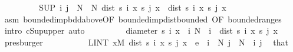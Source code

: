 \begin{isabellebody}
\ \ \ \ \ \ \isamarkupfalse%
\ \isamarkupfalse%
\ {\isachardoublequoteopen}{\isacharparenleft}{\kern0pt}SUP\ {\isacharparenleft}{\kern0pt}i{\isacharcomma}{\kern0pt}\ j{\isacharparenright}{\kern0pt}\ {\isasymin}\ {\isacharbraceleft}{\kern0pt}N{\isachardot}{\kern0pt}{\isachardot}{\kern0pt}{\isacharbraceright}{\kern0pt}\ {\isasymtimes}\ {\isacharbraceleft}{\kern0pt}N{\isachardot}{\kern0pt}{\isachardot}{\kern0pt}{\isacharbraceright}{\kern0pt}{\isachardot}{\kern0pt}\ dist\ {\isacharparenleft}{\kern0pt}s\ i\ x{\isacharparenright}{\kern0pt}\ {\isacharparenleft}{\kern0pt}s\ j\ x{\isacharparenright}{\kern0pt}{\isacharparenright}{\kern0pt}\ {\isasymge}\ dist\ {\isacharparenleft}{\kern0pt}s\ i\ x{\isacharparenright}{\kern0pt}\ {\isacharparenleft}{\kern0pt}s\ j\ x{\isacharparenright}{\kern0pt}{\isachardoublequoteclose}\ \isamarkupfalse%
\ asm\ bounded{\isacharunderscore}{\kern0pt}imp{\isacharunderscore}{\kern0pt}bdd{\isacharunderscore}{\kern0pt}above{\isacharbrackleft}{\kern0pt}OF\ bounded{\isacharunderscore}{\kern0pt}imp{\isacharunderscore}{\kern0pt}dist{\isacharunderscore}{\kern0pt}bounded{\isacharcomma}{\kern0pt}\ OF\ bounded{\isacharunderscore}{\kern0pt}range{\isacharunderscore}{\kern0pt}s{\isacharbrackright}{\kern0pt}\ \isamarkupfalse%
\ {\isacharparenleft}{\kern0pt}intro\ cSup{\isacharunderscore}{\kern0pt}upper{\isacharcomma}{\kern0pt}\ auto{\isacharparenright}{\kern0pt}\isanewline
\ \ \ \ \ \ \isamarkupfalse%
\ \isamarkupfalse%
\ {\isachardoublequoteopen}diameter\ {\isacharbraceleft}{\kern0pt}s\ i\ x\ {\isacharbar}{\kern0pt}\ i{\isachardot}{\kern0pt}\ N\ {\isasymle}\ i{\isacharbraceright}{\kern0pt}\ {\isasymge}\ dist\ {\isacharparenleft}{\kern0pt}s\ i\ x{\isacharparenright}{\kern0pt}\ {\isacharparenleft}{\kern0pt}s\ j\ x{\isacharparenright}{\kern0pt}{\isachardoublequoteclose}\ \isamarkupfalse%
\ presburger\isanewline
\ \ \ \ \isacommand{{\isacharbraceright}{\kern0pt}}\isamarkupfalse%
\isanewline
\ \ \ \ \isamarkupfalse%
\ {\isachardoublequoteopen}LINT\ x{\isacharbar}{\kern0pt}M{\isachardot}{\kern0pt}\ dist\ {\isacharparenleft}{\kern0pt}s\ i\ x{\isacharparenright}{\kern0pt}\ {\isacharparenleft}{\kern0pt}s\ j\ x{\isacharparenright}{\kern0pt}\ {\isacharless}{\kern0pt}\ e{\isachardoublequoteclose}\ \ {\isachardoublequoteopen}i\ {\isasymge}\ N{\isachardoublequoteclose}\ {\isachardoublequoteopen}j\ {\isasymge}\ N{\isachardoublequoteclose}\ \ i\ j\ \isamarkupfalse%
\ that\ {\isacharasterisk}{\kern0pt}\ \isamarkupfalse%

\end{isabellebody}
